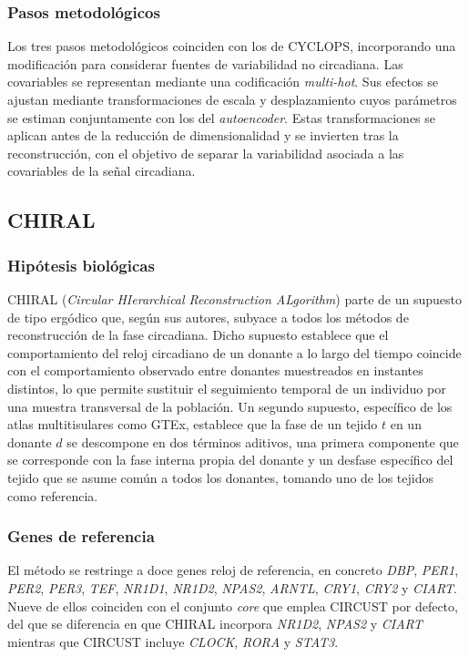 \documentclass[12pt, a4paper]{report}
\begin{document}
\subsubsection*{Pasos metodológicos}
Los tres pasos metodológicos coinciden con los de CYCLOPS, incorporando una modificación para considerar fuentes de variabilidad no circadiana. Las covariables se representan mediante una codificación \textit{multi-hot}. Sus efectos se ajustan mediante transformaciones de escala y desplazamiento cuyos parámetros se estiman conjuntamente con los del \textit{autoencoder}. Estas transformaciones se aplican antes de la reducción de dimensionalidad y se invierten tras la reconstrucción, con el objetivo de separar la variabilidad asociada a las covariables de la señal circadiana.

\subsection{CHIRAL}
\label{sec:chiral}

\subsubsection*{Hipótesis biológicas}
CHIRAL (\textit{Circular HIerarchical Reconstruction ALgorithm}) \citep{talamanca2023, chiral2020} parte de un supuesto de tipo ergódico que, según sus autores, subyace a todos los métodos de reconstrucción de la fase circadiana. Dicho supuesto establece que el comportamiento del reloj circadiano de un donante a lo largo del tiempo coincide con el comportamiento observado entre donantes muestreados en instantes distintos, lo que permite sustituir el seguimiento temporal de un individuo por una muestra transversal de la población. Un segundo supuesto, específico de los atlas multitisulares como GTEx, establece que la fase de un tejido \(t\) en un donante \(d\) se descompone en dos términos aditivos, una primera componente que se corresponde con la 
fase interna propia del donante y un desfase específico del tejido que se asume común a todos los donantes, tomando uno de los tejidos como referencia.

\subsubsection*{Genes de referencia}
El método se restringe a doce genes reloj de referencia, en concreto \textit{DBP}, \textit{PER1}, \textit{PER2}, \textit{PER3}, \textit{TEF}, \textit{NR1D1}, \textit{NR1D2}, \textit{NPAS2}, \textit{ARNTL}, \textit{CRY1}, \textit{CRY2} y \textit{CIART}. Nueve de ellos coinciden con el conjunto \textit{core} que emplea CIRCUST por defecto, del que se diferencia en que CHIRAL incorpora \textit{NR1D2}, \textit{NPAS2} y \textit{CIART} mientras que CIRCUST incluye \textit{CLOCK}, \textit{RORA} y \textit{STAT3}.
\end{document}
